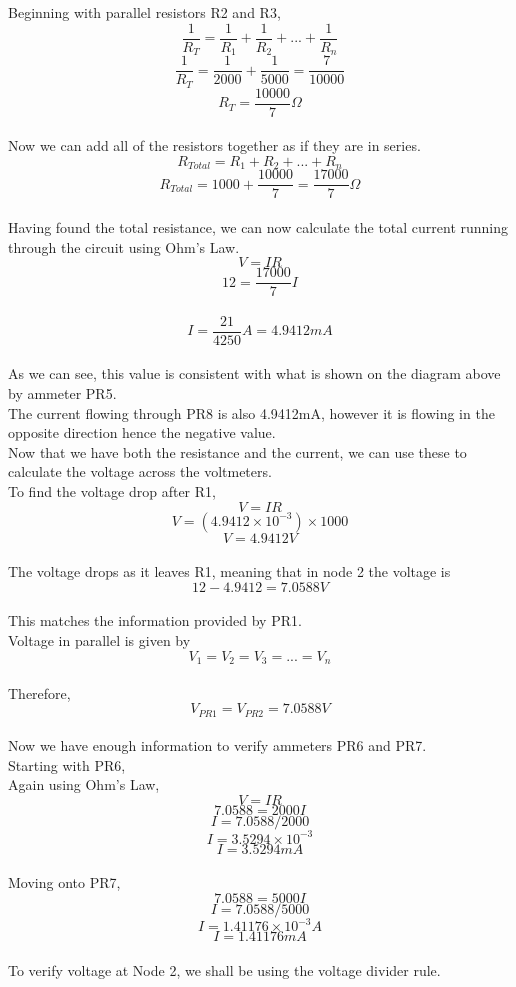 \documentclass[12pt]{article}
\begin{document}
\noindent Beginning with parallel resistors R2 and R3,\\
\[\frac{1}{R_T} = \frac{1}{R_1} + \frac{1}{R_2} + ... + \frac{1}{R_n}\]
\[\frac{1}{R_T} = \frac{1}{2000} + \frac{1}{5000} = \frac{7}{10000}\]
\[R_T = \frac{10000}{7}\Omega\]\\
Now we can add all of the resistors together as if they are in series.\\
\[R_{Total} = R_1 + R_2 + ... + R_n\]
\[R_{Total} = 1000 + \frac{10000}{7} = \frac{17000}{7}\Omega\]\\
Having found the total resistance, we can now calculate the total current running through the circuit using Ohm's Law.\\
\[V = IR\]
\[12 = \frac{17000}{7}I\]
\(\)\[I = \frac{21}{4250}A = 4.9412mA\]\\
As we can see, this value is consistent with what is shown on the diagram above by ammeter PR5.\\
The current flowing through PR8 is also 4.9412mA, however it is flowing in the opposite direction hence the negative value.\\
Now that we have both the resistance and the current, we can use these to calculate the voltage across the voltmeters.\\
To find the voltage drop after R1,\\
\[V = IR\]
\[V = (4.9412 \times 10^{-3}) \times 1000\]
\[V = 4.9412V\]\\
The voltage drops as it leaves R1, meaning that in node 2 the voltage is\\
\[12 - 4.9412 = 7.0588V\]\\
This matches the information provided by PR1.\\
Voltage in parallel is given by\\
\[V_1 = V_2 = V_3 = ... = V_n\]\\
Therefore,\\
\[V_{PR1} = V_{PR2} = 7.0588V\]\\
Now we have enough information to verify ammeters PR6 and PR7.\\
Starting with PR6,\\
Again using Ohm's Law,
\[V = IR\]
\[7.0588 = 2000I\]
\[I = 7.0588 / 2000\]
\[I = 3.5294 \times 10^{-3}\]
\[I = 3.5294mA\]\\
Moving onto PR7,\\
\[7.0588 = 5000I\]
\[I = 7.0588 / 5000\]
\[I = 1.41176 \times 10^{-3}A\]
\[I = 1.41176mA\]\\
To verify voltage at Node 2, we shall be using the voltage divider rule.\\
\end{document}
